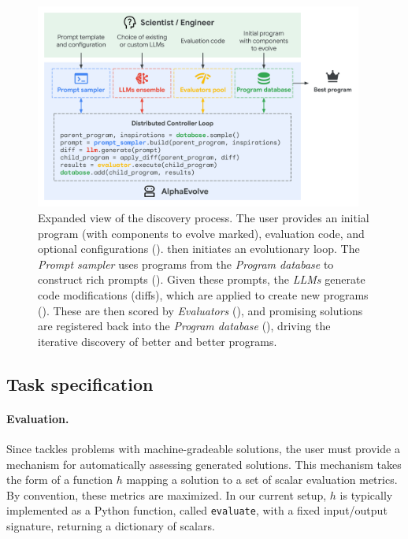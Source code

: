 \begin{figure}[tb]
    \centering
    \includegraphics[width=0.96\textwidth, trim=0cm 0cm 0cm 0cm, clip]{figures/method_detailed.pdf}
    \caption{%
    Expanded view of the \method discovery process. The user provides an initial program (with components to evolve marked), evaluation code, and optional configurations ().
    \method then initiates an evolutionary loop.
    The \emph{Prompt sampler} uses programs from the \emph{Program database} to construct rich prompts ().
    Given these prompts, the \emph{LLMs} generate code modifications (diffs), which are applied to create new programs ().
    These are then scored by \emph{Evaluators} (), and promising solutions are registered back into the \emph{Program database} (), driving the iterative discovery of better and better programs.
    }
    \label{fig:method}
\end{figure}


\subsection{Task specification}
\label{subsec:specification}

\paragraph{Evaluation.} Since \method tackles problems with machine-gradeable solutions, the user must provide a mechanism for automatically assessing generated solutions.
This mechanism takes the form of a function $h$ mapping a solution to a set of scalar evaluation metrics.
By convention, these metrics are maximized.
In our current setup, $h$ is typically implemented as a Python function, called \texttt{evaluate}, with a fixed input/output signature, returning a dictionary of scalars.

